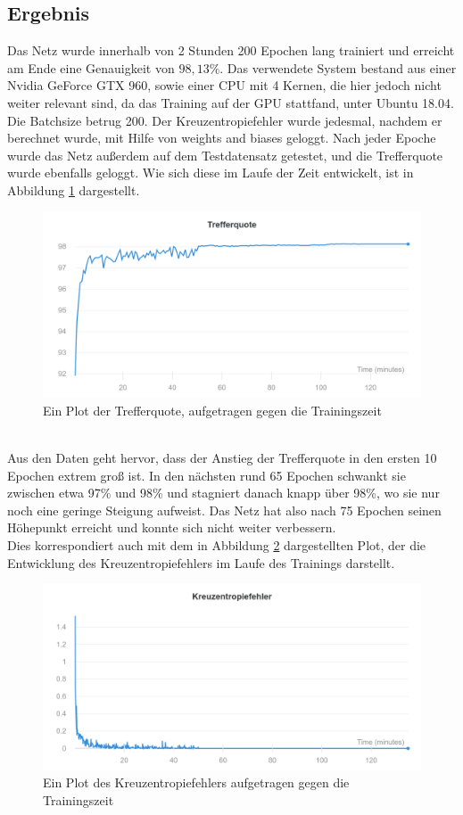 \documentclass[11pt]{article}
\begin{document}
\subsection{Ergebnis}
Das Netz wurde innerhalb von 2 Stunden 200 Epochen lang trainiert und erreicht am Ende eine Genauigkeit von $98,13\%$. Das verwendete System bestand aus einer Nvidia GeForce GTX 960, sowie einer CPU mit 4 Kernen, die hier jedoch nicht weiter relevant sind, da das Training auf der GPU stattfand, unter Ubuntu 18.04. Die Batchsize betrug 200. Der Kreuzentropiefehler wurde jedesmal, nachdem er berechnet wurde, mit Hilfe von weights and biases geloggt. Nach jeder Epoche wurde das Netz außerdem auf dem Testdatensatz getestet, und die Trefferquote wurde ebenfalls geloggt. Wie sich diese im Laufe der Zeit entwickelt, ist in Abbildung \ref{accuracy} dargestellt.
\begin{figure}[h]
	\includegraphics[width=\linewidth]{../graphics/Wandb_accuracy.png}
	\caption{Ein Plot der Trefferquote, aufgetragen gegen die Trainingszeit}
	\label{accuracy}
\end{figure}
\\
Aus den Daten geht hervor, dass der Anstieg der Trefferquote in den ersten 10 Epochen extrem groß ist. In den nächsten rund 65 Epochen schwankt sie zwischen etwa 97\% und 98\% und stagniert danach knapp über 98\%, wo sie nur noch eine geringe Steigung aufweist. Das Netz hat also nach 75 Epochen seinen Höhepunkt erreicht und konnte sich nicht weiter verbessern.\\
Dies korrespondiert auch mit dem in Abbildung \ref{loss} dargestellten Plot, der die Entwicklung des Kreuzentropiefehlers im Laufe des Trainings darstellt.
\begin{figure}[h]
	\includegraphics[width=\linewidth]{../graphics/Wandb_loss.png}
	\caption{Ein Plot des Kreuzentropiefehlers aufgetragen gegen die Trainingszeit}
	\label{loss}
\end{figure}
\end{document}
